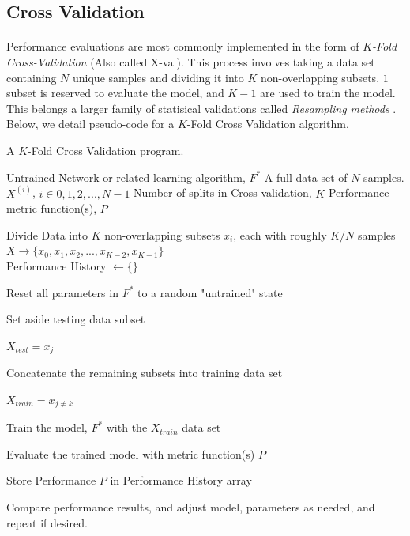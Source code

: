 \documentclass[12pt,letterpaper]{article}
\begin{document}

\subsection{Cross Validation}

\paragraph*{}Performance evaluations are most commonly implemented in the form of \textit{$K$-Fold Cross-Validation} (Also called X-val). This process involves taking a data set containing $N$ unique samples and dividing it into $K$ non-overlapping subsets. $1$ subset is reserved to evaluate the model, and $K-1$ are used to train the model. This belongs a larger family of statisical validations called \textit{Resampling methods} \cite{James}. Below, we detail pseudo-code for a $K$-Fold Cross Validation algorithm.

\begin{algorithm}[H]
\caption{A $K$-Fold Cross Validation program.}
\label{algFeedForward}

\begin{algorithmic}
\REQUIRE Untrained Network or related learning algorithm, $F^*$
\REQUIRE A full data set of $N$ samples. $X^{(i)}$, $i \in {0,1,2,...,N-1}$
\REQUIRE Number of splits in Cross validation, $K$
\REQUIRE Performance metric function(s), $P$

Divide Data into $K$ non-overlapping subsets $x_{i}$, each with roughly $K/N$ samples \\
$X \rightarrow \big\{ x_{0}, x_{1}, x_{2}, ..., x_{K-2},  x_{K-1} \big\}$ \\
Performance History $\leftarrow \{\}$

	\item Reset all parameters in $F^*$ to a random "untrained" state
	\item Set aside testing data subset
	\item $X_{test} = x_{j}$
	\item Concatenate the remaining subsets into training data set
	\item $X_{train} = x_{j \neq k}$
	\item Train the model, $F^*$ with the $X_{train}$ data set
	\item Evaluate the trained model with metric function(s) $P$
	\item Store Performance $P$ in Performance History array
\ENDFOR

Compare performance results, and adjust model, parameters as needed, and repeat if desired.

\end{algorithmic}
\end{algorithm}
\end{document}
